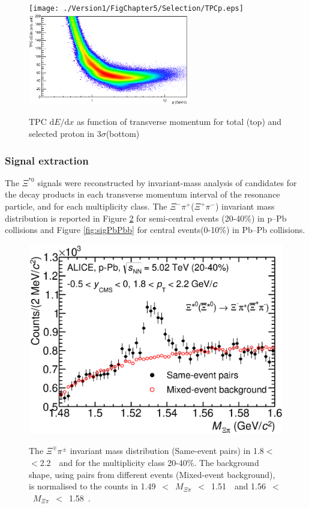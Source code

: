 \begin{figure}[htbp]
\begin{center}
\texttt{[image: ./Version1/FigChapter5/Selection/TPCp.eps]}
\hspace{0.5cm}
\includegraphics[width=7.0cm]{./Version1/FigChapter5/Selection/TPCpAfter.eps}
\label{fig:TPCp} 
\caption{ TPC $\mathrm{d}E/\mathrm{d}x$ as function of transverse momentum for total (top) and selected proton in 3$\sigma$(bottom) }
\end{center}
\end{figure}
 
\newpage
\subsubsection{Signal extraction}\label{sec:pPb:signal}

The $\Xi^{*0}$ signals were reconstructed by invariant-mass analysis 
of candidates for the decay products in each transverse momentum interval of the resonance 
particle, and for each multiplicity class. The  $\Xi^-\pi^+$($\Xi^+\pi^-$) invariant mass distribution is reported in Figure \ref{fig:sigpPbb} for semi-central events (20-40\%) in p--Pb collisions and Figure \ref{fig:sigPbPbb} for central events(0-10\%) in Pb--Pb collisions.


\begin{figure}[htbp]
\begin{center}
\includegraphics[width=12.0cm]{./Version1/FigChapter5/Extraction/SigpPb_Before.eps}
\hspace{0.5cm}
\label{fig:sigpPbb} 
\caption{ The $\Xi^{\mp}\pi^{\pm}$ invariant mass distribution (Same-event pairs) in 
1.8$<$ \pt $<$2.2~\gmom~and for the multiplicity class 20-40\%. The background shape, 
using pairs from different events (Mixed-event background), is normalised to the counts in 
1.49~$<$~$M_{\Xi\pi}$~$<$~1.51~\Gmass~and 1.56~$<$~$M_{\Xi\pi}$~$<$~1.58~\Gmass. }
\end{center}
\end{figure}

